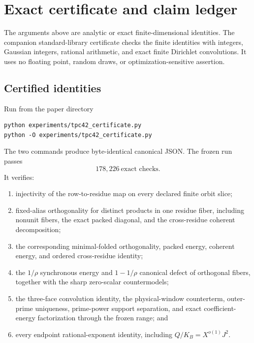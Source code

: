 \section{Exact certificate and claim ledger}
\label{sec:tpc42-certificate}

The arguments above are analytic or exact finite-dimensional identities.
The companion standard-library certificate checks the finite identities
with integers, Gaussian integers, rational arithmetic, and exact finite
Dirichlet convolutions.  It uses no floating point, random draws, or
optimization-sensitive assertion.

\subsection{Certified identities}

Run from the paper directory
\begin{verbatim}
python experiments/tpc42_certificate.py
python -O experiments/tpc42_certificate.py
\end{verbatim}
The two commands produce byte-identical canonical JSON.  The frozen run
passes
\begin{equation}
 \boxed{178{,}226\ \text{exact checks}.}
 \label{eq:tpc42-certificate-count}
\end{equation}
It verifies:
\begin{enumerate}[label=(\roman*)]
 \item injectivity of the row-to-residue map on every declared finite
 orbit slice;
 \item fixed-alias orthogonality for distinct products in one residue
 fiber, including nonunit fibers, the exact packed diagonal, and the
 cross-residue coherent
 decomposition;
 \item the corresponding minimal-folded orthogonality, packed energy,
 coherent energy, and ordered cross-residue identity;
 \item the \(1/\rho\) synchronous energy and
 \(1-1/\rho\) canonical defect of orthogonal fibers, together with the
 sharp zero-scalar countermodels;
 \item the three-face convolution identity, the physical-window
 counterterm, outer-prime uniqueness, prime-power support separation, and
 exact coefficient-energy factorization through the frozen range; and
 \item every endpoint rational-exponent identity, including
 \(Q/K_B=X^{o(1)}J^2\).
\end{enumerate}

